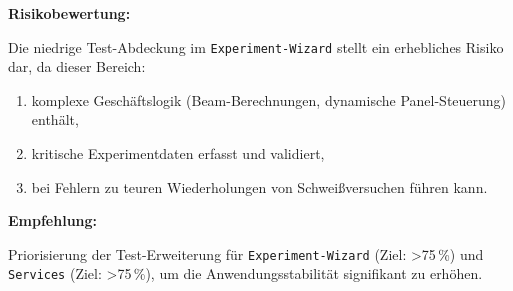 \textbf{Risikobewertung:}

Die niedrige Test-Abdeckung im \texttt{Experiment-Wizard} stellt ein erhebliches Risiko dar, da dieser Bereich:
\begin{enumerate}
	\item komplexe Geschäftslogik (Beam-Berechnungen, dynamische Panel-Steuerung) enthält,
	\item kritische Experimentdaten erfasst und validiert,
	\item bei Fehlern zu teuren Wiederholungen von Schweißversuchen führen kann.
\end{enumerate}

\textbf{Empfehlung:}

Priorisierung der Test-Erweiterung für \texttt{Experiment-Wizard} (Ziel: >75\,\%) und \texttt{Services} (Ziel: >75\,\%), um die Anwendungsstabilität signifikant zu erhöhen.


%
%     
%     
%     


